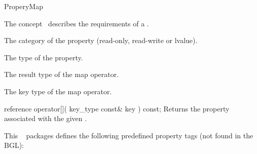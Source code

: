 
\begin{ccRefConcept}{ProperyMap}


\ccDefinition

The concept \ccRefName\ describes the requirements of a .

\ccTypes
   {The category of the property (read-only, read-write or lvalue).}{}
  
   {The type of the property.}{}
    
   {The result type of the map operator.}{}
    
   {The key type of the map operator.}{}


\ccOperations

\ccMethod
  {reference operator[]( key_type const& key ) const;}
  {Returns the property associated with the given .}  

This \cgal\  packages defines the following predefined property tags (not found in the BGL):

\ccEnumeration
\item {}
\item {}
\item {}
  
\ccHasModels
{}\\
\\
\\
\\
\\

\end{ccRefConcept}



